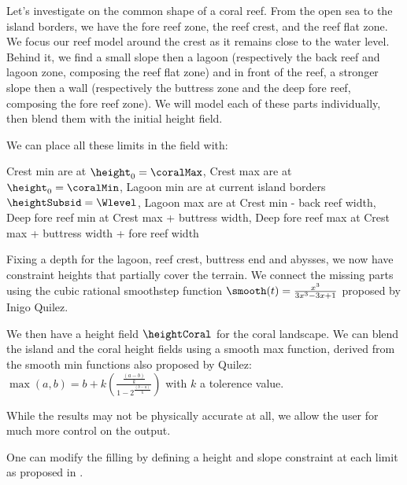 Let's investigate on the common shape of a coral reef. From the open sea to the island borders, we have the fore reef zone, the reef crest, and the reef flat zone. We focus our reef model around the crest as it remains close to the water level. Behind it, we find a small slope then a lagoon (respectively the back reef and lagoon zone, composing the reef flat zone) and in front of the reef, a stronger slope then a wall (respectively the buttress zone and the deep fore reef, composing the fore reef zone). We will model each of these parts individually, then blend them with the initial height field.

We can place all these limits in the field with:
\begin{Itemize}
    \Item{} Crest min are at $\height_0 = \coralMax$,
    \Item{} Crest max are at $\height_0 = \coralMin$,
    \Item{} Lagoon min are at current island borders $\heightSubsid = \Wlevel$,
    \Item{} Lagoon max are at Crest min - back reef width,
    \Item{} Deep fore reef min at Crest max + buttress width,
    \Item{} Deep fore reef max at Crest max + buttress width + fore reef width
\end{Itemize}

Fixing a depth for the lagoon, reef crest, buttress end and abysses, we now have constraint heights that partially cover the terrain. We connect the missing parts using the cubic rational smoothstep function $\smooth(t) = \frac{x^3}{3x^3 - 3x + 1}$ proposed by Inigo Quilez.

We then have a height field $\heightCoral$ for the coral landscape. We can blend the island and the coral height fields using a smooth max function, derived from the smooth min functions also proposed by Quilez: $\max(a, b) = b + k \left( \frac{\frac{\left( a-b \right)}{k}}{1-2^{\frac{\left( b - a  \right)}{k}}} \right)$ with $k$ a tolerence value. 


While the results may not be physically accurate at all, we allow the user for much more control on the output.

One can modify the filling by defining a height and slope constraint at each limit as proposed in \citep{Guerin2022}.


